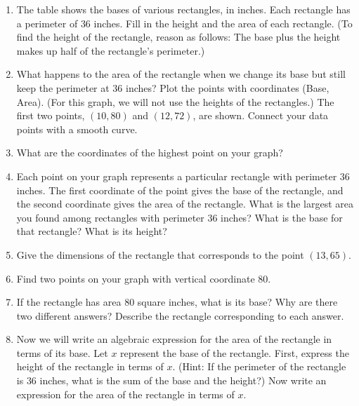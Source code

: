 \documentclass[10pt,]{book}
\theoremstyle{plain}
\theoremstyle{definition}
\theoremstyle{definition}
\numberwithin{equation}{section}
\begin{document}
\begin{enumerate}
\item\hypertarget{li-225}{}The table shows the bases of various rectangles, in inches. Each rectangle has a perimeter of \(36\) inches. Fill in the height and the area of each rectangle. (To find the height of the rectangle, reason as follows: The base plus the height makes up half of the rectangle’s perimeter.)
\item\hypertarget{li-226}{}What happens to the area of the rectangle when we change its base but still keep the perimeter at \(36\) inches? Plot the points with coordinates (Base, Area). (For this graph, we will not use the heights of the rectangles.) The first two points, \((10, 80)\) and \((12, 72)\), are shown. Connect your data points with a smooth curve.
\item\hypertarget{li-227}{}What are the coordinates of the highest point on your graph?%
\item\hypertarget{li-228}{}Each point on your graph represents a particular rectangle with perimeter \(36\) inches. The first coordinate of the point gives the base of the rectangle, and the second coordinate gives the area of the rectangle. What is the largest area you found among rectangles with perimeter \(36\) inches? What is the base for that rectangle? What is its height?
\item\hypertarget{li-229}{}Give the dimensions of the rectangle that corresponds to the point \((13, 65)\).
\item\hypertarget{li-230}{}Find two points on your graph with vertical coordinate \(80\).
\item\hypertarget{li-231}{}If the rectangle has area \(80\) square inches, what is its base? Why are there two different answers? Describe the rectangle corresponding to each answer.
\item\hypertarget{li-232}{}Now we will write an algebraic expression for the area of the rectangle in terms of its base. Let \(x\) represent the base of the rectangle. First, express the height of the rectangle in terms of \(x\). (Hint: If the perimeter of the rectangle is \(36\) inches, what is the sum of the base and the height?) Now write an expression for the area of the rectangle in terms of \(x\).

\end{enumerate}
\end{document}
